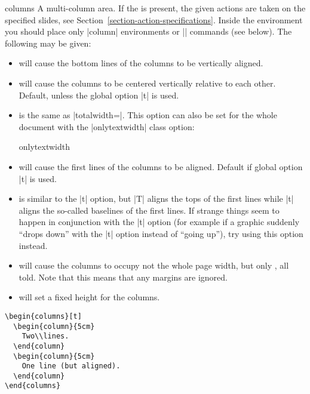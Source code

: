\begin{environment}{{columns}}
  A multi-column area. If the  is present, the given actions are taken on the specified slides, see Section~\ref{section-action-specifications}. Inside the environment you should place only |column| environments or |\column| commands (see below). The following  may be given:
  \begin{itemize}
  \item
     will cause the bottom lines of the columns to be vertically aligned.
  \item
     will cause the columns to be centered vertically relative to each other. Default, unless the global option |t| is used.
  \item
     is the same as |totalwidth=\textwidth|. This option can also be set for the whole document with the |onlytextwidth| class option:
    \begin{classoption}{onlytextwidth}
    \end{classoption}
  \item
     will cause the first lines of the columns to be aligned. Default if global option |t| is used.
  \item
     is similar to the |t| option, but |T| aligns the tops of the first lines while |t| aligns the so-called baselines of the first lines. If strange things seem to happen in conjunction with the |t| option (for example if a graphic suddenly ``drops down'' with the |t| option instead of ``going up''), try using this option instead.
  \item
     will cause the columns to occupy not the whole page width, but only , all told.
     Note that this means that any margins are ignored.
  \item
     will set a fixed height for the columns. 
  \end{itemize}

  \example
\begin{verbatim}
\begin{columns}[t]
  \begin{column}{5cm}
    Two\\lines.
  \end{column}
  \begin{column}{5cm}
    One line (but aligned).
  \end{column}
\end{columns}
\end{verbatim}


\end{environment}
